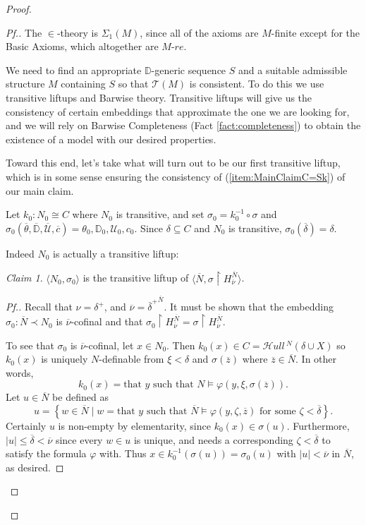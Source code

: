 \documentclass{amsart}
\theoremstyle{definition}
\theoremstyle{remark}
\newtheorem{claimno}{Claim}
\newcommand{\D}{\mathbb{D}}
\newcommand{\N}{{\overline{N}}}
\newcommand{\U}{\mathcal{U}}
\newcommand{\st}{\; | \;}
\newcommand{\set}[2]{\left\{#1\st #2 \right\}}
\newcommand{\SH}{\mathcal{H}\textit{ull} \,}
\newcommand{\Sk}[3]{\SH^{#1}( {#2} \cup {#3} ) }
\begin{document}
\begin{proof}
\begin{proof}[Pf.]
The $\in$-theory is $\Sigma_1(M)$, since all of the axioms are $M$-finite except for the \textsf{Basic Axioms}, which altogether are $M$-$re$.

We need to find an appropriate $\D$-generic sequence $S$ and a suitable admissible structure $M$ containing $S$ so that $\mathcal T(M)$ is consistent. To do this we use transitive liftups and Barwise theory. Transitive liftups will give us the consistency of certain embeddings that approximate the one we are looking for, and we will rely on Barwise Completeness (Fact \ref{fact:completeness}) to obtain the existence of a model with our desired properties. 

Toward this end, let's take what will turn out to be our first transitive liftup, which is in some sense ensuring the consistency of (\ref{item:MainClaimC=Sk}) of our main claim.

Let $k_0 : N_0 \cong C$ where $N_0$ is transitive, and set $\sigma_0 = k_0^{-1} \circ \sigma$ and $\sigma_0(\overline \theta, \overline{\D}, \overline{\U}, \overline c) = \theta_0, \D_0, \U_0, c_0.$
Since $\delta \subseteq C$ and $N_0$ is transitive, $\sigma_0(\overline \delta)=\delta$. 

Indeed $N_0$ is actually a transitive liftup:

\begin{claimno} \label{claim:N0isliftupofN} $\langle N_0, \sigma_0 \rangle$ is the transitive liftup of $\langle \N, \sigma \upharpoonright H_{\overline \nu}^{\N} \rangle$. \end{claimno}
\begin{proof}[Pf.] Recall that $\nu=\delta^+$, and $\overline \nu={\overline \delta^+}^{\N}$. It must be shown that the embedding $\sigma_0: \overline N \prec N_0$ is $\overline \nu$-cofinal and that $\sigma_0 \upharpoonright H_{\overline \nu}^{\N}=\sigma \upharpoonright H_{\overline \nu}^{\overline N}$. 

To see that $\sigma_0$ is $\overline \nu$-cofinal, let $x \in N_0$. Then $k_0(x) \in C = \Sk{N}{\delta}{X}$ so $k_0(x)$ is uniquely $N$-definable from $\xi < \delta$ and $\sigma(\overline z)$ where $\overline z \in \N$. In other words, $$k_0(x) = \text{that } y \text{ such that } N \models \varphi(y, \xi, \sigma(\overline z)).$$ Let $u \in \N$ be defined as 
	$$u=\set{ w \in \N }{  w=\text{that } y \text{ such that } \N \models \varphi(y, \zeta, \overline z) \text{ for some } \zeta < \overline \delta }.$$
Certainly $u$ is non-empty by elementarity, since $k_0(x) \in \sigma(u).$
Furthermore, $|u| \leq \overline \delta < \overline \nu$ since every $w \in u$ is unique, and needs a corresponding $\zeta<\overline \delta$ to satisfy the formula $\varphi$ with.
Thus $x \in k_0^{-1}(\sigma(u))=\sigma_0(u)$ with $|u| < \overline \nu$ in $\N$, as desired. 


\end{proof}
\end{proof}
\end{proof}
\end{document}
